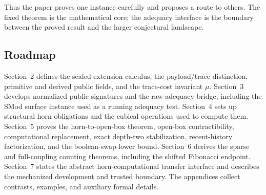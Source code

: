 Thus the paper proves one instance carefully and proposes a route to others.  The
fixed theorem is the mathematical core; the adequacy interface is the boundary
between the proved result and the larger conjectural landscape.

\subsection{Roadmap}

Section~2 defines the sealed-extension calculus, the payload/trace distinction,
primitive and derived public fields, and the trace-cost invariant \(\mu\).
Section~3 develops normalized public signatures and the raw adequacy bridge,
including the SMod surface instance used as a running adequacy test.  Section~4
sets up structural horn obligations and the cubical operations used to compute
them.  Section~5 proves the horn-to-open-box theorem, open-box contractibility,
computational replacement, exact depth-two stabilization, recent-history
factorization, and the boolean-swap lower bound.  Section~6 derives the sparse
and full-coupling counting theorems, including the shifted Fibonacci endpoint.
Section~7 states the abstract horn-computational transfer interface and describes
the mechanized development and trusted boundary.  The appendices collect
contrasts, examples, and auxiliary formal details.
